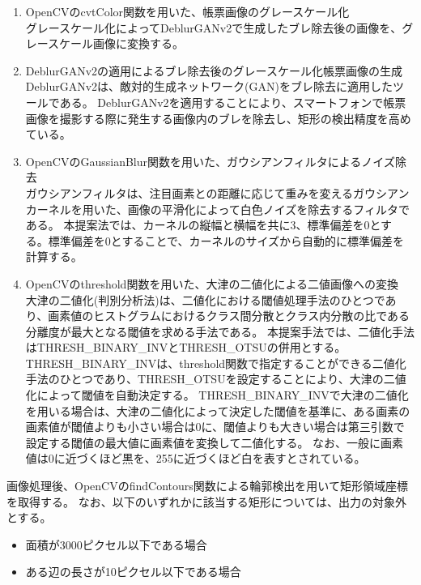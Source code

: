 \begin{enumerate}
    \item OpenCVのcvtColor関数を用いた、帳票画像のグレースケール化\\
        グレースケール化によってDeblurGANv2で生成したブレ除去後の画像を、グレースケール画像に変換する。
    \item DeblurGANv2の適用によるブレ除去後のグレースケール化帳票画像の生成\\
        DeblurGANv2は、敵対的生成ネットワーク(GAN)をブレ除去に適用したツールである\cite{DeblurGANv2}。
        DeblurGANv2を適用することにより、スマートフォンで帳票画像を撮影する際に発生する画像内のブレを除去し、矩形の検出精度を高めている。
    \item OpenCVのGaussianBlur関数を用いた、ガウシアンフィルタによるノイズ除去\\
        ガウシアンフィルタは、注目画素との距離に応じて重みを変えるガウシアンカーネルを用いた、画像の平滑化によって白色ノイズを除去するフィルタである。
        本提案法では、カーネルの縦幅と横幅を共に3、標準偏差を0とする。標準偏差を0とすることで、カーネルのサイズから自動的に標準偏差を計算する\cite{ガウシアンフィルタ}。
    \item OpenCVのthreshold関数を用いた、大津の二値化による二値画像への変換\\
        大津の二値化(判別分析法)は、二値化における閾値処理手法のひとつであり、画素値のヒストグラムにおけるクラス間分散とクラス内分散の比である分離度が最大となる閾値を求める手法である\cite{大津の二値化}。
        本提案手法では、二値化手法はTHRESH\_BINARY\_INVとTHRESH\_OTSUの併用とする。
        THRESH\_BINARY\_INVは、threshold関数で指定することができる二値化手法のひとつであり、THRESH\_OTSUを設定することにより、大津の二値化によって閾値を自動決定する。
        THRESH\_BINARY\_INVで大津の二値化を用いる場合は、大津の二値化によって決定した閾値を基準に、ある画素の画素値が閾値よりも小さい場合は0に、閾値よりも大きい場合は第三引数で設定する閾値の最大値に画素値を変換して二値化する。
        なお、一般に画素値は0に近づくほど黒を、255に近づくほど白を表すとされている。
\end{enumerate}

画像処理後、OpenCVのfindContours関数による輪郭検出を用いて矩形領域座標を取得する。
なお、以下のいずれかに該当する矩形については、出力の対象外とする。

\begin{itemize}
    \item 面積が3000ピクセル以下である場合
    \item ある辺の長さが10ピクセル以下である場合
\end{itemize}


